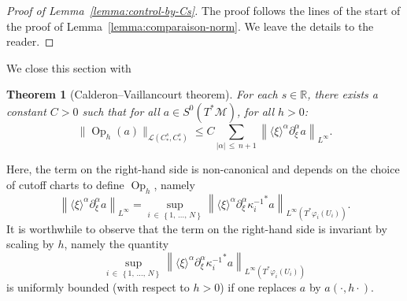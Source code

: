 \documentclass[10pt]{amsart}
\newtheorem{theo}{Theorem}[section]
\theoremstyle{definition}\newtheorem{defi}[theo]{Definition}\newtheorem{rema}[theo]{Remark}\newtheorem{exam}[theo]{Example}\newtheorem{exem}[theo]{Example}\newtheorem{nota}[theo]{Notation}
\newcommand{\R}{\mathbb{R}}
\newcommand{\mc}{\mathcal}
\newcommand{\M}{\mathcal{M}}
\DeclareMathOperator{\Op}{Op}
\begin{document}
\begin{proof}[Proof of Lemma~\ref{lemma:control-by-Cs}]
The proof follows the lines of the start of the proof of Lemma~\ref{lemma:comparaison-norm}. We leave the details to the reader.
\end{proof}



We close this section with
\begin{theo}[Calderon--Vaillancourt theorem]\label{theorem:cv}
For each $s\in \R$, there exists a constant $C > 0$ such that for all $a \in S^0(T^*\M)$, for all $h>0$:
\[
\|\Op_h(a)\|_{\mc{L}(C^s_*,C^s_*)} \leq C \sum_{|\alpha|\,\leq\,n+1} \left\|\langle \xi \rangle^\alpha \partial^\alpha_\xi a\right\|_{L^\infty}.
\]
\end{theo}

Here, the term on the right-hand side is non-canonical and depends on the choice of cutoff charts to define $\Op_h$, namely
\[
\left\|\langle \xi \rangle^\alpha \partial^\alpha_\xi a\right\|_{L^\infty} = \sup_{i\,\in\,\left\{1,\,\dots,\,N\right\}} \left\|\langle \xi \rangle^\alpha \partial^\alpha_\xi {\kappa_i^{-1}}^*a\right\|_{L^\infty\left(T^* \varphi_i(U_i)\right)}.
\]
It is worthwhile to observe that the term on the right-hand side is invariant by scaling by $h$, namely the quantity
\[
\sup_{i\,\in\,\left\{1,\,\dots,\,N\right\}} \left\|\langle \xi \rangle^\alpha \partial^\alpha_\xi {\kappa_i^{-1}}^*a\right\|_{L^\infty\left(T^* \varphi_i(U_i)\right)}
\]
is uniformly bounded (with respect to $h > 0$) if one replaces $a$ by $a(\cdot,h\cdot)$.
\end{document}
